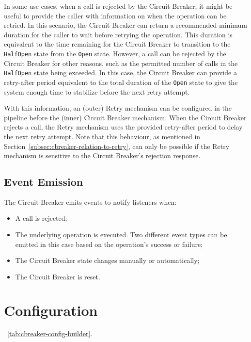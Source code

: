 In some use cases, when a call is rejected by the Circuit Breaker,
it might be useful to provide the caller with information on when the operation can be retried.
In this scenario, the Circuit Breaker can return a recommended minimum
duration for the caller to wait before retrying the operation.
This duration is equivalent to the time
remaining for the Circuit Breaker to transition to the \texttt{HalfOpen} state from the \texttt{Open} state.
However, a call can be rejected by the Circuit Breaker for other reasons,
such as the permitted number of calls in the \texttt{HalfOpen} state being exceeded.
In this case, the Circuit Breaker can provide a retry-after period equivalent to the total duration of the \texttt{Open} state to give the system enough time to stabilize before the next retry attempt.

With this information,
an (outer) Retry mechanism can be configured in the pipeline before the
(inner) Circuit Breaker mechanism.
When the Circuit Breaker rejects a call,
the Retry mechanism uses the provided retry-after period to delay the next retry attempt.
Note that this behaviour, as mentioned in Section~\ref{subsec:cbreaker-relation-to-retry}, can only be possible
if the Retry mechanism is sensitive to the Circuit Breaker's rejection response.

\subsection{Event Emission}\label{subsec:cbreaker-event-emission}

The Circuit Breaker emits events to notify listeners when:

\begin{itemize}
    \item A call is rejected;
    \item The underlying operation is executed.
    Two different event types can be emitted in this case based on the operation's success or failure;
    \item The Circuit Breaker state changes manually or automatically;
    \item The Circuit Breaker is reset.
\end{itemize}


\section{Configuration}\label{sec:cbreaker-configuration}

~\ref{tab:cbreaker-config-builder}.

